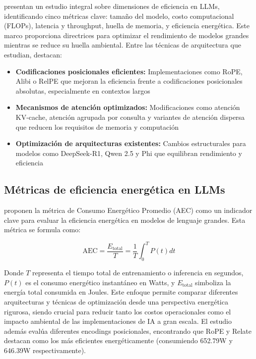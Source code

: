 \textcite{yuan2025efficientllm} presentan un estudio integral sobre dimensiones de eficiencia en LLMs, identificando cinco métricas clave: tamaño del modelo, costo computacional (FLOPs), latencia y throughput, huella de memoria, y eficiencia energética. Este marco proporciona directrices para optimizar el rendimiento de modelos grandes mientras se reduce su huella ambiental. Entre las técnicas de arquitectura que estudian, destacan:

\begin{itemize}
    \item \textbf{Codificaciones posicionales eficientes:} Implementaciones como RoPE, Alibi o RelPE que mejoran la eficiencia frente a codificaciones posicionales absolutas, especialmente en contextos largos
    \item \textbf{Mecanismos de atención optimizados:} Modificaciones como atención KV-cache, atención agrupada por consulta y variantes de atención dispersa que reducen los requisitos de memoria y computación
    \item \textbf{Optimización de arquitecturas existentes:} Cambios estructurales para modelos como DeepSeek-R1, Qwen 2.5 y Phi que equilibran rendimiento y eficiencia 
\end{itemize}

\subsection{Métricas de eficiencia energética en LLMs}

\textcite{yuan2025efficientllm} proponen la métrica de Consumo Energético Promedio (AEC) como un indicador clave para evaluar la eficiencia energética en modelos de lenguaje grandes. Esta métrica se formula como:

\begin{equation}
\text{AEC} = \frac{E_{\text{total}}}{T} = \frac{1}{T}\int_{0}^{T}P(t)dt
\end{equation}

Donde $T$ representa el tiempo total de entrenamiento o inferencia en segundos, $P(t)$ es el consumo energético instantáneo en Watts, y $E_{\text{total}}$ simboliza la energía total consumida en Joules. Este enfoque permite comparar diferentes arquitecturas y técnicas de optimización desde una perspectiva energética rigurosa, siendo crucial para reducir tanto los costos operacionales como el impacto ambiental de las implementaciones de IA a gran escala. El estudio además evalúa diferentes encodings posicionales, encontrando que RoPE y Relate destacan como los más eficientes energéticamente (consumiendo 652.79W y 646.39W respectivamente).

